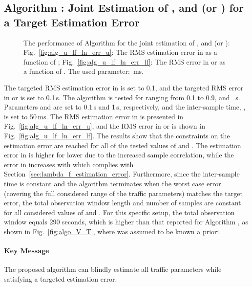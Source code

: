 \documentclass[11pt,draftclsnofoot,journal,onecolumn]{IEEEtran}
\begin{document}
\subsection{Algorithm : Joint Estimation of , and  (or ) for a Target Estimation Error}
\label{sec:algorithm_numerical_u_lf_ln}

\begin{figure}
\centering
{}
\caption{The performance of Algorithm  for the joint estimation of , and  (or ): Fig.~\ref{fig:alg_u_lf_ln_err_u}: The RMS estimation error in  as a function of ; Fig.~\ref{fig:alg_u_lf_ln_err_lf}: The RMS error in  or  as a function of . The used parameter: \,ms.}
\end{figure}

The targeted RMS estimation error in  is set to 0.1, and the targeted RMS error in  or  is set to 0.1\,s. The algorithm is tested for  ranging from 0.1 to 0.9, and \, s. Parameters  and  are set to 0.1\,s and 1\,s, respectively, and the inter-sample time, , is set to 50\,ms. The RMS estimation error in  is presented in Fig.~\ref{fig:alg_u_lf_ln_err_u}, and the RMS error in  or  is shown in Fig.~\ref{fig:alg_u_lf_ln_err_lf}. The results show that the constraints on the estimation error are reached for all of the tested values of  and . The estimation error in  is higher for lower  due to the increased sample correlation, while the error in  increases with  which complies with Section~\ref{sec:lambda_f_estimation_error}. Furthermore, since the inter-sample time is constant and the algorithm terminates when the worst case error (covering the full considered range of the traffic parameters) matches the target error, the total observation window length and number of samples are constant for all considered values of  and . For this specific setup, the total observation window equals 290 seconds, which is higher than that reported for Algorithm , as shown in Fig.~\ref{fig:algo_V_T}, where  was assumed to be known a priori.

\paragraph*{Key Message}

The proposed algorithm can blindly estimate all traffic parameters while satisfying a targeted estimation error.
\end{document}
